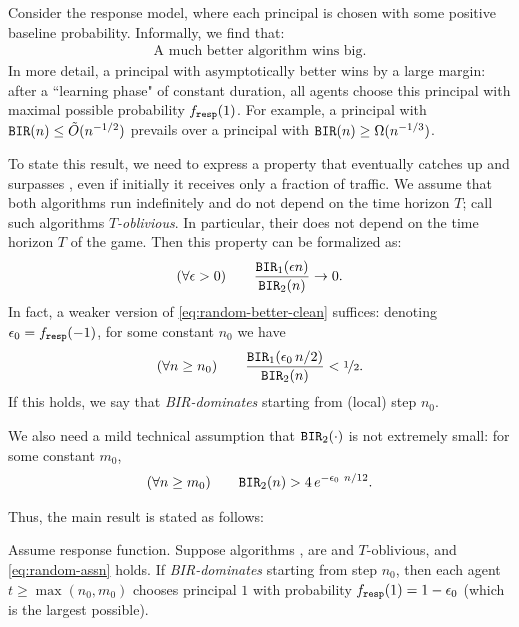 Consider the \HardMaxRandom response model, where each principal is chosen with some positive baseline probability. Informally, we find that:
\begin{align}\label{eq:theory-HMR-informal}
\text{A much better algorithm wins big.}
\end{align}
In more detail, a principal with asymptotically better \BIR wins by a large margin: after a ``learning phase" of constant duration, all agents choose this principal with maximal possible probability $f_{\mathtt{resp}}(1)$. For example, a principal with $\mathtt{BIR}(n)\leq \tilde{O}(n^{-1/2})$ prevails over a principal with $\mathtt{BIR}(n)\geq \Omega(n^{-1/3})$.



To state this result, we need to express a property that \alg[1] eventually catches up and surpasses \alg[2], even if initially it receives only a fraction of traffic. We assume that both algorithms run indefinitely and do not depend on the time horizon $T$; call such algorithms \emph{$T$-oblivious}. In particular, their \BIR does not depend on the time horizon $T$ of the game.  Then this property can be formalized as:
\begin{align}\label{eq:random-better-clean}
(\forall \epsilon>0)\qquad
\frac{\mathtt{BIR}_1(\epsilon n)}{\mathtt{BIR}_2(n)} \to 0.
\end{align}
In fact, a weaker version of \eqref{eq:random-better-clean} suffices:
denoting $\epsilon_0 = f_{\mathtt{resp}}(-1)$, for some constant $n_0$ we have
\begin{align}\label{eq:random-better-weaker}
(\forall n\geq n_0) \qquad
\frac{\mathtt{BIR}_1(\epsilon_0\, n/2)}{\mathtt{BIR}_2(n)} <\nicefrac12.
\end{align}
If this holds, we say that \alg[1] \emph{BIR-dominates} \alg[2] starting from (local) step $n_0$.

We also need a mild technical assumption that $\mathtt{BIR}_2(\cdot)$ is not extremely small: for some constant $m_0$,
\begin{align}\label{eq:random-assn}
 (\forall n\geq m_0) \qquad
  \mathtt{BIR}_2(n) > 4\,e^{-\epsilon_0\ n/12}.
\end{align}

Thus, the main result is stated as follows:

\begin{theorem}\label{thm:random-clean}
Assume \HardMaxRandom response function. Suppose algorithms \alg[1], \alg[2] are \bmonotone and $T$-oblivious, and \eqref{eq:random-assn} holds. If \alg[1] \emph{BIR-dominates} \alg[2] starting from step $n_0$, then each agent $t\geq \max(n_0,m_0)$ chooses principal $1$ with probability $f_{\mathtt{resp}}(1) = 1- \epsilon_0$ (which is the largest possible).
\end{theorem}




